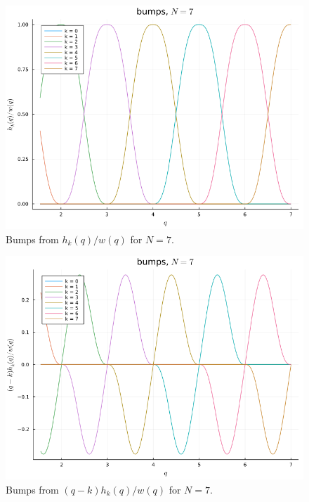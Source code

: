 \documentclass[12pt]{article}
\begin{document}
\begin{figure}[H]
    \centering
    \includegraphics[scale=0.5]{img/BUMP/BUMP_hw_N=7.png}
    \caption{Bumps from $h_k(q)/w(q)$ for $N=7$.}
    \label{fig:linear_BUMP_x_N=7}
\end{figure}

\begin{figure}[H]
    \centering
    \includegraphics[scale=0.5]{img/BUMP/BUMP_qhw_N=7.png}
    \caption{Bumps from $(q-k)h_k(q)/w(q)$ for $N=7$.}
    \label{fig:linear_BUMP_y_N=7}
\end{figure}
\end{document}
